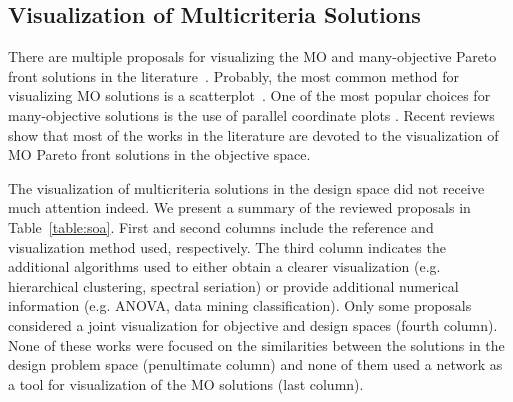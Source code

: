 \documentclass[journal]{IEEEtran}
\begin{document}
\subsection{Visualization of Multicriteria Solutions}
\label{sec:soa}

There are multiple proposals for visualizing the MO and many-objective Pareto front solutions in the literature~\cite{Walker13}. Probably, the most common method for visualizing MO solutions is a scatterplot~\cite{Chambers82}. One of the most popular choices for many-objective solutions is the use of parallel coordinate plots \cite{inselberg09}.
Recent reviews~\cite{Walker13,Tusar15} show that most of the works in the literature are devoted to the visualization of MO Pareto front solutions in the objective space. 

The visualization of multicriteria solutions in the design space did not receive much attention indeed. 
We present a summary of the reviewed proposals in Table~\ref{table:soa}. First and second columns include the reference and visualization method used, respectively. The third column indicates the additional algorithms used to either obtain a clearer visualization (e.g. hierarchical clustering, spectral seriation) or provide additional numerical information (e.g. ANOVA, data mining classification). Only some proposals considered a joint visualization for objective and design spaces (fourth column). None of these works were focused on the similarities between the solutions in the design problem space (penultimate column) and none of them used a network as a tool for visualization of the MO solutions (last column).
\end{document}
